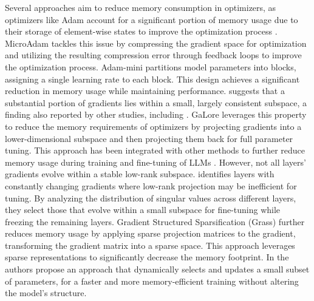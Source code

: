 Several approaches aim to reduce memory consumption in optimizers, as optimizers like Adam \citep{kingma2017adammethodstochasticoptimization} account for a significant portion of memory usage due to their storage of element-wise states to improve the optimization process \citep{li2023memoryefficientoptimizers4bit, anil2019memoryefficientadaptiveoptimization, lv-etal-2024-full, dettmers20228bitoptimizersblockwisequantization, rajabi2024memoryefficient, rajabi2024accelerating}. MicroAdam \citep{modoranu2024microadamaccurateadaptiveoptimization} tackles this issue by compressing the gradient space for optimization and utilizing the resulting compression error through feedback loops to improve the optimization process. Adam-mini \citep{zhang2024adamminiusefewerlearning} partitions model parameters into blocks, assigning a single learning rate to each block. This design achieves a significant reduction in memory usage while maintaining performance.
\citet{gurari2018gradientdescenthappenstiny} suggests that a substantial portion of gradients lies within a small, largely consistent subspace, a finding also reported by other studies, including \citet{schneider2024identifyingpolicygradientsubspaces, yaras2023invariant}. GaLore \citep{zhao2024galorememoryefficientllmtraining} leverages this property to reduce the memory requirements of optimizers by projecting gradients into a lower-dimensional subspace and then projecting them back for full parameter tuning. This approach has been integrated with other methods to further reduce memory usage during training and fine-tuning of LLMs \citep{li2024owloreoutlierweighedlayerwisesampled, rajabi2024enhancing}. However, not all layers' gradients evolve within a stable low-rank subspace. \citet{jaiswal2024galorewelorelowrankweights} identifies layers with constantly changing gradients where low-rank projection may be inefficient for tuning. By analyzing the distribution of singular values across different layers, they select those that evolve within a small subspace for fine-tuning while freezing the remaining layers. Gradient Structured Sparsification (Grass) \citep{muhamed2024grasscomputeefficientlowmemory} further reduces memory usage by applying sparse projection matrices to the gradient, transforming the gradient matrix into a sparse space. This approach leverages sparse representations to significantly decrease the memory footprint. In \citet{ramesh2024blockllmmemoryefficientadaptationllms} the authors propose an approach that dynamically selects and updates a small subset of parameters, for a faster and more memory-efficient training without altering the model's structure.

